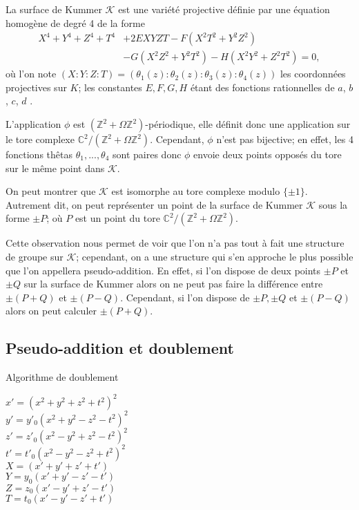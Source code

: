\documentclass[a4paper,12pt]{article}
\theoremstyle{definition}
\theoremstyle{remark}
\numberwithin{equation}{section}
\begin{document}
La surface de Kummer $\mathcal{K}$ est une variété projective définie par une équation homogène de degré 4 de la forme
\begin{align*}
X^4+Y^4+Z^4+T^4&+2EXYZT-F(X^2T^2+Y^2Z^2) \\
&-G(X^2Z^2+Y^2T^2)-H(X^2Y^2+Z^2T^2)=0,
\end{align*}
où l'on note $(X:Y:Z:T)=(\theta_1(z):\theta_2(z):\theta_3(z):\theta_4(z))$ les coordonnées projectives sur $K$; les constantes $E,F,G,H$ étant des fonctions rationnelles de $a$, $b$, $c$, $d$ \citep{gaudry}.

L'application $\phi$ est $(\mathbb{Z}^2 + \Omega\mathbb{Z}^2)$-périodique, elle définit donc une application sur le tore complexe $\mathbb{C}^2/(\mathbb{Z}^2+\Omega\mathbb{Z}^2)$. Cependant, $\phi$ n'est pas bijective; en effet, les 4 fonctions thêtas $\theta_1,...,\theta_4$ sont paires donc $\phi$ envoie deux points opposés du tore sur le même point dans $\mathcal{K}$.

On peut montrer que $\mathcal{K}$ est isomorphe au tore complexe modulo $\{\pm 1\}$. Autrement dit, on peut représenter un point de la surface de Kummer $\mathcal{K}$ sous la forme $\pm P$; où $P$ est un point du tore $\mathbb{C}^2/(\mathbb{Z}^2+\Omega\mathbb{Z}^2)$.

Cette observation nous permet de voir que l'on n'a pas tout à fait une structure de groupe sur $\mathcal{K}$; cependant, on a une structure qui s'en approche le plus possible que l'on appellera pseudo-addition. En effet, si l'on dispose de deux points $\pm P$ et $\pm Q$ sur la surface de Kummer alors on ne peut pas faire la différence entre $\pm(P+Q)$ et $\pm(P-Q)$. Cependant, si l'on dispose de $\pm P,\pm Q$ et $\pm(P-Q)$ alors on peut calculer $\pm(P+Q)$.

\subsection{Pseudo-addition et doublement}

\begin{algorithm}
\label{DOUBLE}
\caption{Algorithme de doublement}
$x' = (x^2 + y^2 + z^2 + t^2)^2$ \\
$y' = y'_0(x^2 + y^2 - z^2 - t^2)^2$ \\
$z' = z'_0(x^2 - y^2 + z^2 - t^2)^2$ \\
$t' = t'_0(x^2 - y^2 - z^2 + t^2)^2$ \\
$X = (x' + y' + z' + t')$ \\
$Y = y_0(x' + y' - z' - t')$ \\
$Z = z_0(x' - y' + z' - t')$ \\
$T = t_0(x' - y' - z' + t')$ \\
\end{algorithm}
\end{document}
